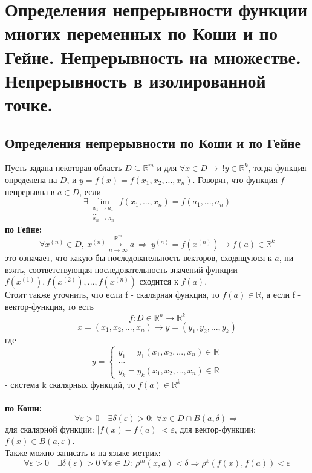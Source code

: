 \section{Определения непрерывности функции многих переменных по Коши и по Гейне.
Непрерывность на множестве.
Непрерывность в изолированной точке.}
\subsection{Определения непрерывности по Коши и по Гейне}
Пусть задана некоторая область $D \subseteq \mathbb{R}^m$ и для $ \forall x \in D \rightarrow \ ! y \in \mathbb{R}^{k}$, тогда функция определена на $D$, и $y=f(x)=f(x_{1}, x_{2}, ... , x_{n})$. Говорят, что функция $f$ - непрерывна в $a \in D$, если
$$
\exists \lim_{\substack{x_{1}\to a_{1}\\ ... \\{x_{n}\to a_{n}}}}{f(x_{1},..., x_{n})} = f(a_{1},..., a_{n})
$$
\textbf{по Гейне:}
$$
\forall x^{(n)} \in D, \ x^{(n)} \overset{\mathbb{R}^{m}}{\underset{n \rightarrow \infty}{\longrightarrow}} a \ \Rightarrow \
y^{(n)} = f(x^{(n)}) \rightarrow f(a) \in \mathbb{R}^{k}
$$
это означает, что какую бы последовательность векторов, сходящуюся к $a$, ни взять, соответствующая последовательность значений функции
$
f(x^{(1)}), f(x^{(2)}), ..., f(x^{(n)})
$
сходится к $f(a)$. \\
Стоит также уточнить, что если f - скалярная функция, то $f(a) \in \mathbb{R}$, а если f - вектор-функция, то есть
$$
f: D \in \mathbb{R}^{n} \rightarrow \mathbb{R}^{k}
$$
$$
x = (x_{1}, x_{2}, ... , x_{n}) \rightarrow y = (y_{1}, y_{2}, ... , y_{k})
$$
где
\begin{equation*}
y =
\begin{cases}
y_{1} =y_{1}(x_{1}, x_{2}, ... , x_{n}) \in \mathbb{R}\\
... \\
y_{k} =y_{k}(x_{1}, x_{2}, ... , x_{n}) \in \mathbb{R}
\end{cases}
\end{equation*}
- система k скалярных функций, то $f(a) \in \mathbb{R}^{k}$
\\\\
\textbf{по Коши:}
$$
\forall \varepsilon>0 \quad \exists \delta(\varepsilon)>0 :\ \forall x \in D \cap B(a, \delta)
\Rightarrow
$$
для скалярной функции: $|f(x) - f(a)| < \varepsilon$,
для вектор-функции: $f(x) \in B(a, \varepsilon)$.\\
Также можно записать и на языке метрик:
$$
\forall \varepsilon>0 \quad \exists \delta(\varepsilon)>0 \ \forall x \in D :\ \rho^{m}(x,a) < \delta
\Rightarrow \rho^{k}(f(x), f(a)) < \varepsilon
$$
